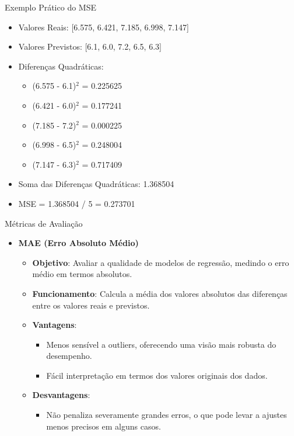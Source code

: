 \documentclass[handout,aspectratio = 169]{beamer}
\begin{document}
\begin{frame}{Exemplo Prático do MSE}
\begin{itemize}
    \item Valores Reais: [6.575, 6.421, 7.185, 6.998, 7.147]
    \item Valores Previstos: [6.1, 6.0, 7.2, 6.5, 6.3]
    \item Diferenças Quadráticas:
    \begin{itemize}
        \item (6.575 - 6.1)\(^2\) = 0.225625
        \item (6.421 - 6.0)\(^2\) = 0.177241
        \item (7.185 - 7.2)\(^2\) = 0.000225
        \item (6.998 - 6.5)\(^2\) = 0.248004
        \item (7.147 - 6.3)\(^2\) = 0.717409
    \end{itemize}
    \item Soma das Diferenças Quadráticas: 1.368504
    \item MSE = 1.368504 / 5 = 0.273701
\end{itemize}
\end{frame}


\begin{frame}{Métricas de Avaliação}
\begin{itemize}
    \item \textbf{MAE (Erro Absoluto Médio)}
    \begin{itemize}
        \item \textbf{Objetivo}: Avaliar a qualidade de modelos de regressão, medindo o erro médio em termos absolutos.
        \item \textbf{Funcionamento}: Calcula a média dos valores absolutos das diferenças entre os valores reais e previstos.
        \item \textbf{Vantagens}:
        \begin{itemize}
            \item Menos sensível a outliers, oferecendo uma visão mais robusta do desempenho.
            \item Fácil interpretação em termos dos valores originais dos dados.
        \end{itemize}
        \item \textbf{Desvantagens}:
        \begin{itemize}
            \item Não penaliza severamente grandes erros, o que pode levar a ajustes menos precisos em alguns casos.
        \end{itemize}
    \end{itemize}
\end{itemize}
\end{frame}
\end{document}
